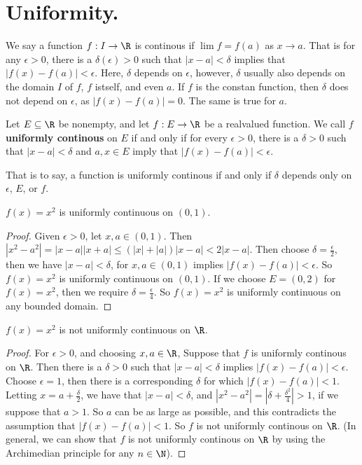 
\section{Uniformity.}

We say a function  $f:I \rightarrow \R$ is continous if  $\lim{f}=f(a)$ as  $x \rightarrow a$. 
That is for any  $\epsilon>0$, there is a  $\delta(\epsilon)>0$ such that  $|x-a|<\delta$ implies 
that  $|f(x)-f(a)|<\epsilon$. Here,  $\delta$ depends on  $\epsilon$, however, $\delta$ usually also depends
on the domain  $I$ of  $f$,  $f$ istself, and even  $a$. If  $f$ is the constan function, then 
$\delta$ does not depend on  $\epsilon$, as  $|f(x)-f(a)|=0$. The same is true for  $a$.

\begin{definition}
    Let $E \subseteq \R$ be nonempty, and let $f:E \rightarrow \R$ be a realvalued function. We call 
    $f$ \textbf{uniformly continous} on $E$ if and only if for every $\epsilon>0$, there is a
    $\delta>0$ such that $|x-a|<\delta$ and  $a,x \in E$ imply that $|f(x)-f(a)|<\epsilon$.
\end{definition}

That is to say, a function is uniformly continous if and only if $\delta$ depends only 
on  $\epsilon$,  $E$, or  $f$.

\begin{example}
    $f(x)=x^2$ is uniformly continuous on $(0,1)$.
\end{example} 
\begin{proof}
    Given $\epsilon>0$, let  $x,a \in (0,1)$. Then $|x^2-a^2|=|x-a||x+a| \leq  (|x|+|a|)|x-a|<2|x-a|$. 
    Then choose $\delta=\frac{\epsilon}{2}$, then we have $|x-a|<\delta$, for  $x,a \in (0,1)$ implies 
    $|f(x)-f(a)|<\epsilon$. So $f(x)=x^2$ is uniformly continuous on  $(0,1)$. If we choose $E=(0,2)$ for  $f(x)=x^2$, then we 
    require  $\delta=\frac{\epsilon}{4}$. So $f(x)=x^2$ is uniformly continuous on any bounded domain.
\end{proof}

\begin{example}
    $f(x)=x^2$ is not uniformly continuous on  $\R$.		
\end{example} 
\begin{proof}
    For $\epsilon>0$, and choosing $x,a \in \R$, Suppose that  $f$ is uniformly continous on  $\R$. Then 
    there is a  $\delta>0$ such that  $|x-a|<\delta$ implies  $|f(x)-f(a)|<\epsilon$. Choose $\epsilon=1$, then 
    there is a corresponding $\delta$ for which $|f(x)-f(a)|<1$. Letting  $x=a+\frac{\delta}{2}$, 
    we have that $|x-a|<\delta$, and  $|x^2-a^2|=|\delta+\frac{\delta^2}{4}|>1$, if 
    we suppose that $a>1$. So  $a$ can be as large as possible, and this contradicts the assumption 
    that  $|f(x)-f(a)|<1$. So  $f$ is not uniformly continous on  $\R$.  (In general, we can show 
    that $f$ is not uniformly continous on  $\R$ by using the Archimedian principle for any  $n \in \N$).
\end{proof}

